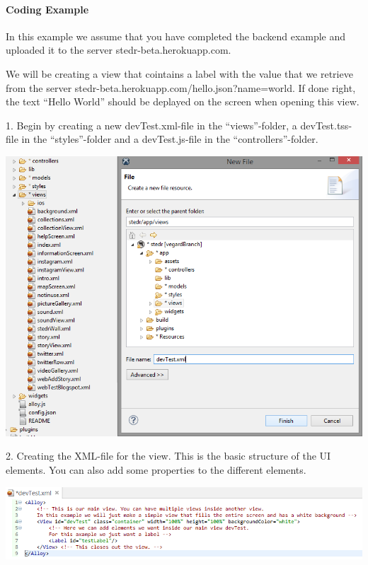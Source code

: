 \paragraph{Coding Example}
In this example we assume that you have completed the backend example and uploaded it to the server stedr-beta.herokuapp.com.

We will be creating a view that cointains a label with the value that we retrieve from the server stedr-beta.herokuapp.com/hello.json?name=world. If done right, the text “Hello World” should be deplayed on the screen when opening this view. 

1. Begin by creating a new devTest.xml-file in the “views”-folder, a devTest.tss-file in the “styles”-folder and a devTest.js-file in the “controllers”-folder.

\begin{center}
\includegraphics[scale=0.45]{guide/f6.png} 
\end{center}

2. Creating the XML-file for the view. This is the basic structure of the UI elements. You can also add some properties to the different elements.

\begin{center}
\includegraphics[scale=0.45]{guide/f7.png} 
\end{center}


